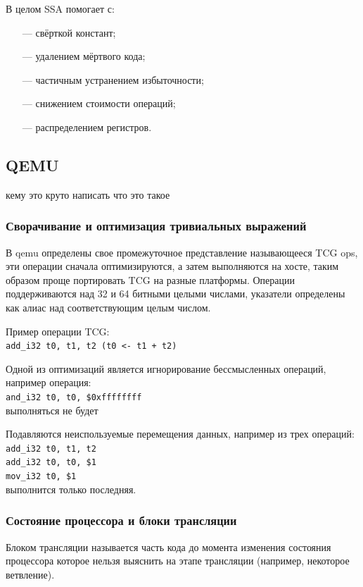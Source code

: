 В целом SSA помогает с:
\begin{itemize}[leftmargin=1.6\parindent]
	\item[---] свёрткой констант;
	\item[---] удалением мёртвого кода;
	\item[---] частичным устранением избыточности;
	\item[---] снижением стоимости операций;
	\item[---] распределением регистров.
\end{itemize}

\subsection{QEMU}

кему это круто написать что это такое \cite{qemu}

\subsubsection{Сворачивание и оптимизация тривиальных выражений}

В qemu определены свое промежуточное представление называющееся TCG ops, эти операции сначала оптимизируются, а затем выполняются на хосте, таким образом проще портировать TCG на разные платформы. Операции поддерживаются над 32 и 64 битными целыми числами, указатели определены как алиас над соответствующим целым числом.

Пример операции TCG:\\
\texttt{add\_i32 t0, t1, t2  (t0 <- t1 + t2)}

Одной из оптимизаций является игнорирование бессмысленных операций, например операция:\\
\texttt{and\_i32 t0, t0, \$0xffffffff\\}
выполняться не будет

Подавляются неиспользуемые перемещения данных, например из трех операций:\\
\texttt{add\_i32 t0, t1, t2\\
add\_i32 t0, t0, \$1\\
mov\_i32 t0, \$1\\}
выполнится только последняя.

\subsubsection{Состояние процессора и блоки трансляции}

Блоком трансляции называется часть кода до момента изменения состояния процессора которое нельзя выяснить на этапе трансляции (например, некоторое ветвление).

